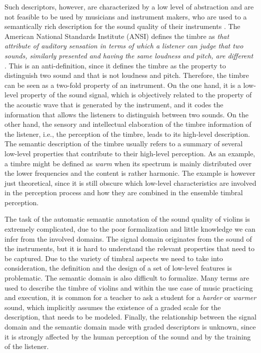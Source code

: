 Such descriptors, however, are characterized by a low level of abstraction and are not feasible to be used by musicians and instrument makers, who are used to a semantically rich description for the sound quality of their instruments \cite{Disley2006}. The American National Standards Institute (ANSI) defines the timbre as \textit{that attribute of auditory sensation in terms of which a listener can judge that two sounds, similarly presented and having the same loudness and pitch, are different} \cite{american1960usa}. This is an anti-definition, since it defines the timbre as the property to distinguish two sound and that is not loudness and pitch. Therefore, the timbre can be seen as a two-fold property of an instrument. On the one hand, it is a low-level property of the sound signal, which is objectively related to the property of the acoustic wave that is generated by the instrument, and it codes the information that allows the listeners to distinguish between two sounds. On the other hand, the sensory and intellectual elaboration of the timbre information of the listener, i.e., the perception of the timbre, leads to its high-level description. The semantic description of the timbre usually refers to a summary of several low-level properties that contribute to their high-level perception. As an example, a timbre might be defined as \textit{warm} when its spectrum is mainly distributed over the lower frequencies and the content is rather harmonic. The example is however just theoretical, since it is still obscure which low-level characteristics are involved in the perception process and how they are combined in the  ensemble timbral perception. 

The task of the automatic semantic annotation of the sound quality of violins is extremely complicated, due to the poor formalization and little knowledge we can infer from the involved domains. 
The signal domain originates from the sound of the instruments, but it is hard to understand the relevant properties that need to be captured. Due to the variety of timbral aspects we need to take into consideration, the definition and the design of a set of low-level features is problematic. 
The semantic domain is also difficult to formalize. Many terms are used to describe the timbre of violins and within the use case of music practicing and execution, it is common for a teacher to ask a student for a \textit{harder} or \textit{warmer} sound, which implicitly assumes the existence of a graded scale for the description, that needs to be modeled. 
Finally, the relationship between the signal domain and the semantic domain made with graded descriptors is unknown, since it is strongly affected by the human perception of the sound and by the training of the listener.

